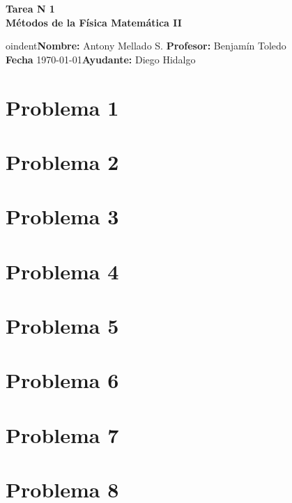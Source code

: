 \documentclass[a4paper, 11pt]{article}
\begin{document}
\begin{center}
\LARGE \bf Tarea N 1\\ M\'etodos de la F\'isica Matem\'atica II
\end{center}

\vspace{1cm} 

oindent\textbf{Nombre:} Antony Mellado S. \hfill \textbf{Profesor:} Benjam\'in Toledo  
\hfill \\
\textbf{Fecha} \today \hfill \textbf{Ayudante:} Diego Hidalgo  \\ 
\vspace{3cm} 


\section*{Problema 1}
\section*{Problema 2}
\section*{Problema 3}
\section*{Problema 4}
\section*{Problema 5}
\section*{Problema 6}
\section*{Problema 7}
\section*{Problema 8}
\end{document}
